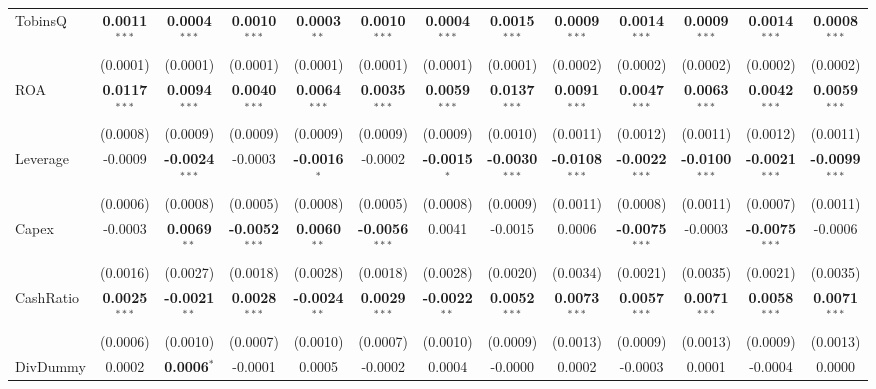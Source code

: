 \documentclass[11pt,a4paper]{article}
\begin{document}
\begin{table}[htbp]
\begin{tabular}{lcccccccccccc}
TobinsQ & \textbf{0.0011}$^{***}$ & \textbf{0.0004}$^{***}$ & \textbf{0.0010}$^{***}$ & \textbf{0.0003}$^{**}$ & \textbf{0.0010}$^{***}$ & \textbf{0.0004}$^{***}$ & \textbf{0.0015}$^{***}$ & \textbf{0.0009}$^{***}$ & \textbf{0.0014}$^{***}$ & \textbf{0.0009}$^{***}$ & \textbf{0.0014}$^{***}$ & \textbf{0.0008}$^{***}$ \\
 & (0.0001) & (0.0001) & (0.0001) & (0.0001) & (0.0001) & (0.0001) & (0.0001) & (0.0002) & (0.0002) & (0.0002) & (0.0002) & (0.0002) \\
ROA & \textbf{0.0117}$^{***}$ & \textbf{0.0094}$^{***}$ & \textbf{0.0040}$^{***}$ & \textbf{0.0064}$^{***}$ & \textbf{0.0035}$^{***}$ & \textbf{0.0059}$^{***}$ & \textbf{0.0137}$^{***}$ & \textbf{0.0091}$^{***}$ & \textbf{0.0047}$^{***}$ & \textbf{0.0063}$^{***}$ & \textbf{0.0042}$^{***}$ & \textbf{0.0059}$^{***}$ \\
 & (0.0008) & (0.0009) & (0.0009) & (0.0009) & (0.0009) & (0.0009) & (0.0010) & (0.0011) & (0.0012) & (0.0011) & (0.0012) & (0.0011) \\
Leverage & -0.0009 & \textbf{-0.0024}$^{***}$ & -0.0003 & \textbf{-0.0016}$^{*}$ & -0.0002 & \textbf{-0.0015}$^{*}$ & \textbf{-0.0030}$^{***}$ & \textbf{-0.0108}$^{***}$ & \textbf{-0.0022}$^{***}$ & \textbf{-0.0100}$^{***}$ & \textbf{-0.0021}$^{***}$ & \textbf{-0.0099}$^{***}$ \\
 & (0.0006) & (0.0008) & (0.0005) & (0.0008) & (0.0005) & (0.0008) & (0.0009) & (0.0011) & (0.0008) & (0.0011) & (0.0007) & (0.0011) \\
Capex & -0.0003 & \textbf{0.0069}$^{**}$ & \textbf{-0.0052}$^{***}$ & \textbf{0.0060}$^{**}$ & \textbf{-0.0056}$^{***}$ & 0.0041 & -0.0015 & 0.0006 & \textbf{-0.0075}$^{***}$ & -0.0003 & \textbf{-0.0075}$^{***}$ & -0.0006 \\
 & (0.0016) & (0.0027) & (0.0018) & (0.0028) & (0.0018) & (0.0028) & (0.0020) & (0.0034) & (0.0021) & (0.0035) & (0.0021) & (0.0035) \\
CashRatio & \textbf{0.0025}$^{***}$ & \textbf{-0.0021}$^{**}$ & \textbf{0.0028}$^{***}$ & \textbf{-0.0024}$^{**}$ & \textbf{0.0029}$^{***}$ & \textbf{-0.0022}$^{**}$ & \textbf{0.0052}$^{***}$ & \textbf{0.0073}$^{***}$ & \textbf{0.0057}$^{***}$ & \textbf{0.0071}$^{***}$ & \textbf{0.0058}$^{***}$ & \textbf{0.0071}$^{***}$ \\
 & (0.0006) & (0.0010) & (0.0007) & (0.0010) & (0.0007) & (0.0010) & (0.0009) & (0.0013) & (0.0009) & (0.0013) & (0.0009) & (0.0013) \\
DivDummy & 0.0002 & \textbf{0.0006}$^{*}$ & -0.0001 & 0.0005 & -0.0002 & 0.0004 & -0.0000 & 0.0002 & -0.0003 & 0.0001 & -0.0004 & 0.0000 \\

\end{tabular}
\end{table}
\end{document}
